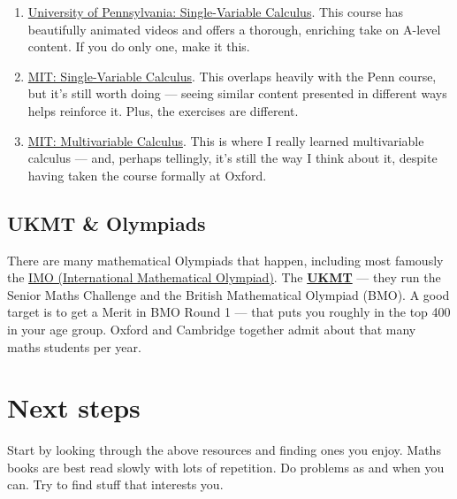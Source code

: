 \documentclass[11pt]{article}
\newif\ifshowpersonal
\newcommand{\personal}[1]{\ifshowpersonal\textcolor{myorange}{\emph{#1}}\fi}
\begin{document}
\begin{enumerate}
\item \href{https://www.coursera.org/learn/single-variable-calculus}{University of Pennsylvania: Single-Variable Calculus}. This course has beautifully animated videos and offers a thorough, enriching take on A-level content. If you do only one, make it this.

\item \href{https://ocw.mit.edu/courses/18-01-calculus-i-single-variable-calculus-fall-2020/}{MIT: Single-Variable Calculus}. This overlaps heavily with the Penn course, but it's still worth doing — seeing similar content presented in different ways helps reinforce it. Plus, the exercises are different.

\item \href{https://ocw.mit.edu/courses/18-02-multivariable-calculus-fall-2007/}{MIT: Multivariable Calculus}. This is where I really learned multivariable calculus — and, perhaps tellingly, it's still the way I think about it, despite having taken the course formally at Oxford.
\end{enumerate}


\subsection{UKMT \& Olympiads}

There are many mathematical Olympiads that happen, including most famously the \href{https://www.imo-official.org/}{IMO (International Mathematical Olympiad)}. The \href{https://ukmt.org.uk/}{\textbf{UKMT}} — they run the Senior Maths Challenge and the British Mathematical Olympiad (BMO). A good target is to get a Merit in BMO Round 1 — that puts you roughly in the top 400 in your age group. Oxford and Cambridge together admit about that many maths students per year. \personal{That said, most people I knew who applied had simply achieved a high-scoring Gold in the Senior Maths Challenge (the round before the Olympiad).}

\section{Next steps}

Start by looking through the above resources and finding ones you enjoy. Maths books are best read slowly with lots of repetition. Do problems as and when you can. Try to find stuff that interests you. 

\personal{While I’ve tried to present this as objectively as possible, bear in mind that it’s all based on my experience. A love of the subject will get you much, much further (eventually) than any kind of natural talent or ability.}
\end{document}
